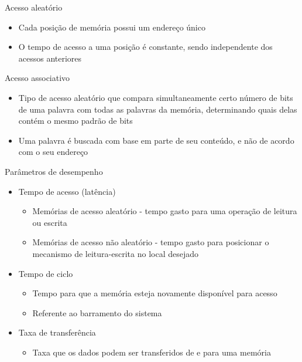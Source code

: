 \documentclass[aspectratio=169,
				xcolor=table]{beamer}
\begin{document}
	\begin{frame}{Acesso aleatório}
		\begin{itemize}
			\item Cada posição de memória possui um endereço único
			\vspace{1em}
			\item O tempo de acesso a uma posição é constante, sendo independente dos acessos anteriores
		\end{itemize}
	\end{frame}
	
	\begin{frame}{Acesso associativo}
		\begin{itemize}
			\item Tipo de acesso aleatório que compara simultaneamente certo número de bits de uma palavra com todas as
palavras da memória, determinando quais delas contém o mesmo padrão de bits
			\vspace{1em}
			\item Uma palavra é buscada com base em parte de seu conteúdo, e não de acordo com o seu endereço
		\end{itemize}
	\end{frame}
	
	\begin{frame}{Parâmetros de desempenho}
		\begin{itemize}
			\item Tempo de acesso (latência)
			\begin{itemize}
				\item Memórias de \alert{acesso aleatório} - tempo gasto para uma operação de leitura ou escrita
				\item Memórias de acesso \alert{não aleatório} - tempo gasto para posicionar o mecanismo de leitura-escrita no local desejado
			\end{itemize}
			\vspace{1em}
			\item Tempo de ciclo
			\begin{itemize}
				\item Tempo para que a memória esteja novamente disponível para acesso
				\item Referente ao barramento do sistema
			\end{itemize}
			\vspace{1em}
			\item Taxa de transferência
			\begin{itemize}
				\item Taxa que os dados podem ser transferidos de e para uma memória
			\end{itemize}
		\end{itemize}
	\end{frame}
	
\end{document}

